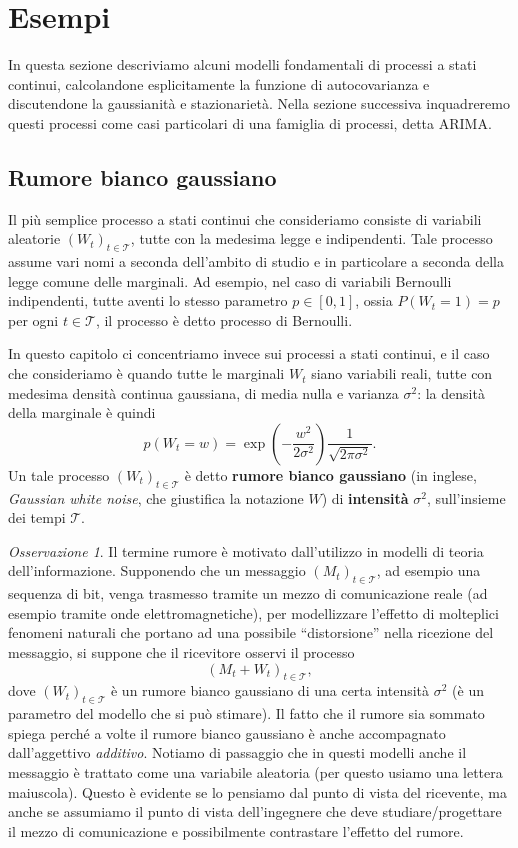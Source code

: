 \documentclass[
  italian,
  letterpaper,
]{book}
\newcommand{\bra}[1]{\left( #1 \right)}
\theoremstyle{definition}
\theoremstyle{remark}
\newtheorem*{remark}{Osservazione}
\begin{document}
\section{Esempi}\label{sec-esempi-wn-rw-se}

In questa sezione descriviamo alcuni modelli fondamentali di processi a
stati continui, calcolandone esplicitamente la funzione di
autocovarianza e discutendone la gaussianità e stazionarietà. Nella
sezione successiva inquadreremo questi processi come casi particolari di
una famiglia di processi, detta ARIMA.

\subsection{Rumore bianco gaussiano}\label{rumore-bianco-gaussiano}

Il più semplice processo a stati continui che consideriamo consiste di
variabili aleatorie \((W_t)_{t \in \mathcal{T} }\), tutte con la
medesima legge e indipendenti. Tale processo assume vari nomi a seconda
dell'ambito di studio e in particolare a seconda della legge comune
delle marginali. Ad esempio, nel caso di variabili Bernoulli
indipendenti, tutte aventi lo stesso parametro \(p \in [0,1]\), ossia
\(P(W_t = 1) = p\) per ogni \(t \in \mathcal{T}\), il processo è detto
processo di Bernoulli.

In questo capitolo ci concentriamo invece sui processi a stati continui,
e il caso che consideriamo è quando tutte le marginali \(W_t\) siano
variabili reali, tutte con medesima densità continua gaussiana, di media
nulla e varianza \(\sigma^2\): la densità della marginale è quindi
\[ p(W_t = w)  = \exp\bra{ - \frac {w^2} {2 \sigma^2} } \frac{1}{\sqrt{ 2 \pi \sigma^2}}.\]
Un tale processo \((W_t)_{t \in \mathcal{T}}\) è detto \textbf{rumore
bianco gaussiano} (in inglese, \emph{Gaussian white noise}, che
giustifica la notazione \(W\)) di \textbf{intensità} \(\sigma^2\),
sull'insieme dei tempi \(\mathcal{T}\).

\begin{remark}
Il termine rumore è motivato dall'utilizzo in modelli di teoria
dell'informazione. Supponendo che un messaggio
\((M_t)_{t \in \mathcal{T}}\), ad esempio una sequenza di bit, venga
trasmesso tramite un mezzo di comunicazione reale (ad esempio tramite
onde elettromagnetiche), per modellizzare l'effetto di molteplici
fenomeni naturali che portano ad una possibile ``distorsione'' nella
ricezione del messaggio, si suppone che il ricevitore osservi il
processo \[  (M_t + W_t)_{t \in \mathcal{T}},\] dove
\((W_t)_{t \in \mathcal{T}}\) è un rumore bianco gaussiano di una certa
intensità \(\sigma^2\) (è un parametro del modello che si può stimare).
Il fatto che il rumore sia sommato spiega perché a volte il rumore
bianco gaussiano è anche accompagnato dall'aggettivo \emph{additivo}.
Notiamo di passaggio che in questi modelli anche il messaggio è trattato
come una variabile aleatoria (per questo usiamo una lettera maiuscola).
Questo è evidente se lo pensiamo dal punto di vista del ricevente, ma
anche se assumiamo il punto di vista dell'ingegnere che deve
studiare/progettare il mezzo di comunicazione e possibilmente
contrastare l'effetto del rumore.
\end{remark}
\end{document}
